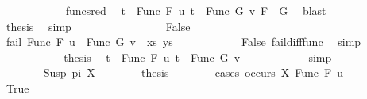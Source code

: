 \begin{isabellebody}
\ \ \ \ \ \ \ \ \ \ \isamarkupfalse%
\ func{\isacharunderscore}{\kern0pt}sred\ \isamarkupfalse%
\ {\isacartoucheopen}t{}\ {\isacharequal}{\kern0pt}\ Func\ F\ u{\isacartoucheclose}\ {\isacartoucheopen}t{}\ {\isacharequal}{\kern0pt}\ Func\ G\ v{\isacartoucheclose}\ {\isacartoucheopen}F\ {\isacharequal}{\kern0pt}\ G{\isacartoucheclose}\ \isamarkupfalse%
\ blast\isanewline
\ \ \ \ \ \ \ \ \isamarkupfalse%
\ \isamarkupfalse%
\ {\isacharquery}{\kern0pt}thesis\ \isamarkupfalse%
\ simp\isanewline
\ \ \ \ \ \ \isamarkupfalse%
\isanewline
\ \ \ \ \ \ \ \ \isamarkupfalse%
\ False\isanewline
\ \ \ \ \ \ \ \ %
\isanewline
\ \ \ \ \ \ \ \ \isamarkupfalse%
\ {\isachardoublequoteopen}fail\ {\isacharparenleft}{\kern0pt}{\isacharparenleft}{\kern0pt}Func\ F\ u\ {\isasymapprox}{\isacharquery}{\kern0pt}\ Func\ G\ v{\isacharparenright}{\kern0pt}\ {\isacharhash}{\kern0pt}\ xs{\isacharcomma}{\kern0pt}\ ys{\isacharparenright}{\kern0pt}{\isachardoublequoteclose}\isanewline
\ \ \ \ \ \ \ \ \ \ \isamarkupfalse%
\ False\ fail{\isacharunderscore}{\kern0pt}diff{\isacharunderscore}{\kern0pt}func\ \isamarkupfalse%
\ simp\isanewline
\ \ \ \ \ \ \ \ \isamarkupfalse%
\ \isamarkupfalse%
\ {\isacharquery}{\kern0pt}thesis\ \isamarkupfalse%
\ {\isacartoucheopen}t{}\ {\isacharequal}{\kern0pt}\ Func\ F\ u{\isacartoucheclose}\ {\isacartoucheopen}t{}\ {\isacharequal}{\kern0pt}\ Func\ G\ v{\isacartoucheclose}\isanewline
\ \ \ \ \ \ \ \ \ \ \isamarkupfalse%
\ simp\isanewline
\ \ \ \ \ \ \isamarkupfalse%
\isanewline
\ \ \ \ \isamarkupfalse%
\isanewline
\ \ \ \ \ \ \isamarkupfalse%
\ {\isacharparenleft}{\kern0pt}Susp\ pi\ X{\isacharparenright}{\kern0pt}\isanewline
\ \ \ \ \ \ \isamarkupfalse%
\ {\isacharquery}{\kern0pt}thesis\isanewline
\ \ \ \ \ \ \isamarkupfalse%
\ {\isacharparenleft}{\kern0pt}cases\ {\isachardoublequoteopen}occurs\ X\ {\isacharparenleft}{\kern0pt}Func\ F\ u{\isacharparenright}{\kern0pt}{\isachardoublequoteclose}{\isacharparenright}{\kern0pt}\isanewline
\ \ \ \ \ \ \ \ \isamarkupfalse%
\ True\isanewline
\ \ \ \ \ \ \ \ %
\isanewline

\end{isabellebody}
